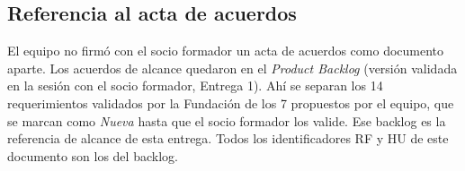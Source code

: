 \subsection{Referencia al acta de acuerdos}
El equipo no firmó con el socio formador un acta de acuerdos como documento aparte. Los acuerdos de alcance quedaron en el \emph{Product Backlog} (versión validada en la sesión con el socio formador, Entrega 1). Ahí se separan los 14 requerimientos validados por la Fundación de los 7 propuestos por el equipo, que se marcan como \emph{Nueva} hasta que el socio formador los valide. Ese backlog es la referencia de alcance de esta entrega. Todos los identificadores RF y HU de este documento son los del backlog.
